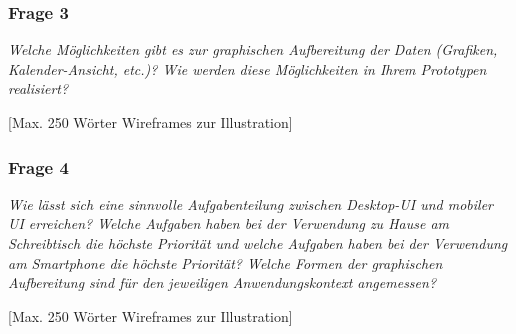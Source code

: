 \subsubsection{Frage 3}

\emph{Welche Möglichkeiten gibt es zur graphischen Aufbereitung der Daten (Grafiken, Kalender-Ansicht, etc.)? Wie werden diese Möglichkeiten in Ihrem Prototypen realisiert?}



[Max. 250 Wörter Wireframes zur Illustration]



\subsubsection{Frage 4}

\emph{Wie lässt sich eine sinnvolle Aufgabenteilung zwischen Desktop-UI und mobiler UI erreichen? Welche Aufgaben haben bei der Verwendung zu Hause am Schreibtisch die höchste Priorität und welche Aufgaben haben bei der Verwendung am Smartphone die höchste Priorität? Welche Formen der graphischen Aufbereitung sind für den jeweiligen Anwendungskontext angemessen?}



[Max. 250 Wörter Wireframes zur Illustration]
